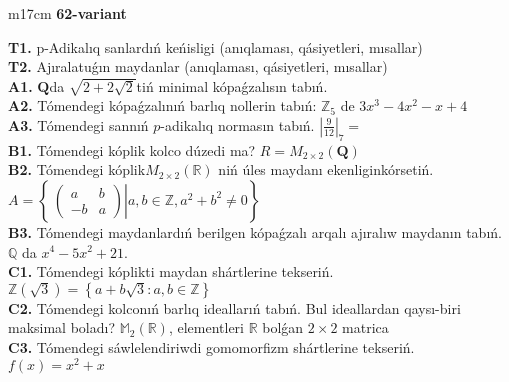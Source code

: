 \documentclass{article}
\begin{document}
\begin{tabular}{m{17cm}}
\textbf{62-variant}
\newline

\textbf{T1.} p-Adikalıq sanlardıń keńisligi (anıqlaması, qásiyetleri, mısallar) \\
\textbf{T2.} Ajıralatuǵın maydanlar (anıqlaması, qásiyetleri, mısallar) \\
\textbf{A1.} \(\mathbf{Q}\)da \(\sqrt{2 + 2\sqrt{2}}\)tiń minimal kópaǵzalısın tabıń. \\
\textbf{A2.} Tómendegi kópaǵzalınıń barlıq nollerin tabıń: \(\mathbb{Z}_{5}\) de \(3x^{3} - 4x^{2} - x + 4\) \\
\textbf{A3.} Tómendegi sannıń \(p\)-adikalıq normasın tabıń. \(|\frac{9}{12}|_{7} =\) \\
\textbf{B1.} Tómendegi kóplik kolco dúzedi ma? \(R = M_{2 \times 2}\left( \mathbf{Q} \right)\) \\
\textbf{B2.} Tómendegi kóplik\(M_{2 \times 2}\left( \mathbb{R} \right)\) niń úles maydanı ekenliginkórsetiń. \(A = \left\{ \left. \ \begin{pmatrix}
a & b \\
 - b & a
\end{pmatrix} \right|a,b\mathbb{\in Z},a^{2} + b^{2} \neq 0 \right\}\) \\
\textbf{B3.} Tómendegi maydanlardıń berilgen kópaǵzalı arqalı ajıralıw maydanın tabıń.
\(\mathbb{Q}\) da \(x^{4} - 5x^{2} + 21\). \\
\textbf{C1.} Tómendegi kóplikti maydan shártlerine tekseriń. \(\mathbb{Z}\left( \sqrt{3} \right) = \left\{ a + b\sqrt{3}:a,b \in \mathbb{Z} \right\}\) \\
\textbf{C2.} Tómendegi kolconıń barlıq ideallarıń tabıń. Bul ideallardan qaysı-biri maksimal boladı? \(\mathbb{M}_{2}\left( \mathbb{R} \right)\), elementleri \(\mathbb{R}\) bolǵan \(2 \times 2\) matrica \\
\textbf{C3.} Tómendegi sáwlelendiriwdi gomomorfizm shártlerine tekseriń. \(f(x) = x^{2} + x\) \\

\end{tabular}
\vspace{1cm}
\end{document}
